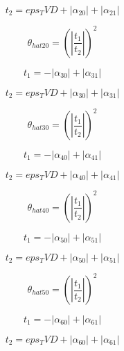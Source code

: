 \documentclass{article}
\begin{document}
\begin{dmath}t_{2} = eps_TVD + \left|{\alpha_{20}}\right| + \left|{\alpha_{21}}\right|\end{dmath}

\begin{dmath}\theta_{hat 20} = \left(\left|{\frac{t_{1}}{t_{2}}}\right| \right)^{2}\end{dmath}

\begin{dmath}t_{1} = - \left|{\alpha_{30}}\right| + \left|{\alpha_{31}}\right|\end{dmath}

\begin{dmath}t_{2} = eps_TVD + \left|{\alpha_{30}}\right| + \left|{\alpha_{31}}\right|\end{dmath}

\begin{dmath}\theta_{hat 30} = \left(\left|{\frac{t_{1}}{t_{2}}}\right| \right)^{2}\end{dmath}

\begin{dmath}t_{1} = - \left|{\alpha_{40}}\right| + \left|{\alpha_{41}}\right|\end{dmath}

\begin{dmath}t_{2} = eps_TVD + \left|{\alpha_{40}}\right| + \left|{\alpha_{41}}\right|\end{dmath}

\begin{dmath}\theta_{hat 40} = \left(\left|{\frac{t_{1}}{t_{2}}}\right| \right)^{2}\end{dmath}

\begin{dmath}t_{1} = - \left|{\alpha_{50}}\right| + \left|{\alpha_{51}}\right|\end{dmath}

\begin{dmath}t_{2} = eps_TVD + \left|{\alpha_{50}}\right| + \left|{\alpha_{51}}\right|\end{dmath}

\begin{dmath}\theta_{hat 50} = \left(\left|{\frac{t_{1}}{t_{2}}}\right| \right)^{2}\end{dmath}

\begin{dmath}t_{1} = - \left|{\alpha_{60}}\right| + \left|{\alpha_{61}}\right|\end{dmath}

\begin{dmath}t_{2} = eps_TVD + \left|{\alpha_{60}}\right| + \left|{\alpha_{61}}\right|\end{dmath}
\end{document}
